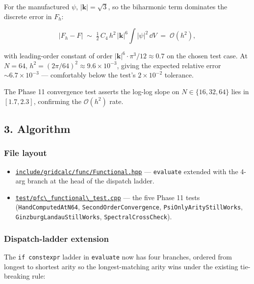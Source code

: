 For the manufactured \(\psi\), \(|\mathbf{k}| = \sqrt{3}\), so the
biharmonic term dominates the discrete error in \(F_h\):

\[
\big| F_h - F \big| \;\sim\; \tfrac{1}{2}\,C_4\,h^2\,|\mathbf{k}|^6 \int |\psi|^2\,\dd V \;=\; \mathcal{O}(h^2),
\]

with leading-order constant of order
\(|\mathbf{k}|^6 \cdot \pi^3 / 12 \approx 0.7\) on the chosen test
case. At \(N = 64\), \(h^2 = (2\pi/64)^2 \approx 9.6 \times 10^{-3}\),
giving the expected relative error \(\sim 6.7 \times 10^{-3}\) ---
comfortably below the test's \(2 \times 10^{-2}\) tolerance.

The Phase 11 convergence test asserts the log-log slope on
\(N \in \{16, 32, 64\}\) lies in \([1.7, 2.3]\), confirming the
\(\mathcal{O}(h^2)\) rate.

\subsection{3. Algorithm}\label{phase11-algorithm}

\subsubsection{File layout}\label{phase11-files}

\begin{itemize}
\tightlist
\item
  \href{../../../include/gridcalc/func/Functional.hpp}{\passthrough{\lstinline!include/gridcalc/func/Functional.hpp!}}
  --- \passthrough{\lstinline!evaluate!} extended with the 4-arg branch
  at the head of the dispatch ladder.
\item
  \href{../../../test/pfc_functional_test.cpp}{\passthrough{\lstinline!test/pfc\_functional\_test.cpp!}}
  --- the five Phase 11 tests
  (\passthrough{\lstinline!HandComputedAtN64!},
  \passthrough{\lstinline!SecondOrderConvergence!},
  \passthrough{\lstinline!PsiOnlyArityStillWorks!},
  \passthrough{\lstinline!GinzburgLandauStillWorks!},
  \passthrough{\lstinline!SpectralCrossCheck!}).
\end{itemize}

\subsubsection{Dispatch-ladder
extension}\label{phase11-dispatch}

The \passthrough{\lstinline!if constexpr!} ladder in
\passthrough{\lstinline!evaluate!} now has four branches, ordered from
longest to shortest arity so the longest-matching arity wins under the
existing tie-breaking rule:

